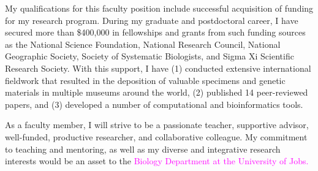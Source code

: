 \documentclass[letterpaper, 10pt]{letter}
\newcommand{\highlight}[1]{\textcolor{magenta}{#1}}
\begin{document}
\begin{letter}


My qualifications for this faculty position include successful acquisition
of funding for my research program.
During my graduate and postdoctoral career, I have secured more than
\$400,000 in fellowships and grants from such funding sources as the 
National Science Foundation,
National Research Council,
National Geographic Society,
Society of Systematic Biologists, and
Sigma Xi Scientific Research Society.
With this support, I have
(1) conducted extensive international fieldwork that resulted in
the deposition of valuable specimens and genetic materials in multiple
museums around the world,
(2) published 14 peer-reviewed papers, and
(3) developed a number of computational and bioinformatics tools.



As a faculty member, I will strive to be a passionate teacher, supportive
advisor, well-funded, productive researcher, and collaborative colleague.
My commitment to teaching and mentoring, as well as my diverse and integrative
research interests would be an asset to the
\highlight{
Biology Department
at
the University of Jobs.
}


\end{letter}
\end{document}
